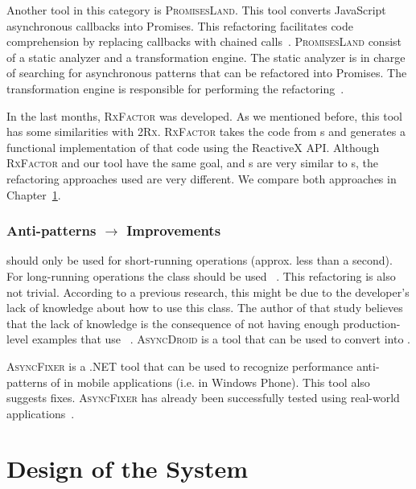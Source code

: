 \documentclass[type=bsc,accentcolor=tud9c]{tudthesis}
\newcommand{\framework}[1]{\textcolor{black!65}{#1}}
\newcommand{\toolcore}{\textsc{2Rx}}
\begin{document}
Another tool in this category is \textsc{PromisesLand}. This tool converts \framework{JavaScript} asynchronous callbacks into \framework{Promises}. This refactoring facilitates code comprehension by replacing callbacks with chained calls~\cite{thesisJavaScript}. \textsc{PromisesLand} consist of a static analyzer and a transformation engine. The static analyzer is in charge of searching for asynchronous patterns that can be refactored into \framework{Promises}. The transformation engine is responsible for performing the refactoring~\cite{thesisJavaScript}.

In the last months, \textsc{RxFactor} was developed. As we mentioned before, this tool has some similarities with \toolcore{}. \textsc{RxFactor} takes the code from s and generates a functional implementation of that code using the \framework{ReactiveX} API. Although \textsc{RxFactor} and our tool have the same goal, and s are very similar to s, the refactoring approaches used are very different. We compare both approaches in Chapter~\ref{chapter:design}.

\subsection{Anti-patterns $\rightarrow$ Improvements}
 should only be used for short-running operations (approx. less than a second). For long-running operations the class  should be used ~\cite{paperStudyRefactoring}. This refactoring is also not trivial. According to a previous research, this might be due to the developer's lack of knowledge about how to use this class. The author of that study believes that the lack of knowledge is the consequence of not having enough production-level examples that use ~\cite{paperStudyRefactoring}. \textsc{AsyncDroid} is a tool that can be used to convert  into .

\textsc{AsyncFixer} is a \framework{.NET} tool that can be used to recognize performance anti-patterns of  in mobile applications (i.e. in \framework{Windows Phone}). This tool also suggests fixes. \textsc{AsyncFixer} has already been successfully tested using real-world applications~\cite{paperAsyncMobile}.

\chapter{Design of the System}
\label{chapter:design}
\end{document}
